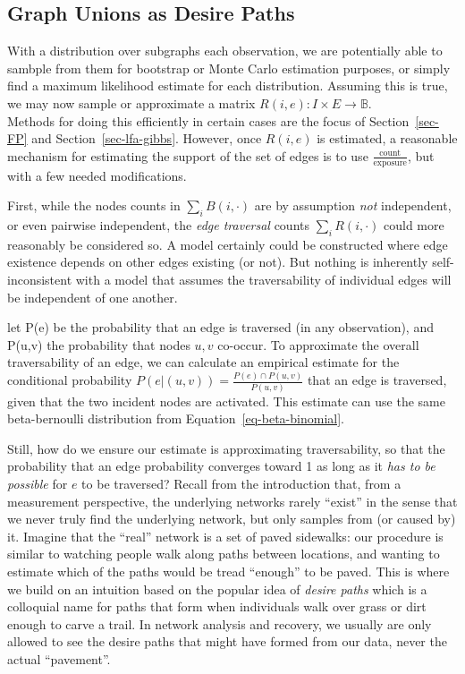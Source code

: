 \documentclass[%
	12pt,
		oneside,
		letterpaper
]{book}
\begin{document}
\subsection{Graph Unions as Desire
Paths}\label{graph-unions-as-desire-paths}

With a distribution over subgraphs each observation, we are potentially
able to sambple from them for bootstrap or Monte Carlo estimation
purposes, or simply find a maximum likelihood estimate for each
distribution. Assuming this is true, we may now sample or approximate a
matrix \(R(i,e):I\times E \rightarrow \mathbb{B}\).\\
Methods for doing this efficiently in certain cases are the focus of
Section~\ref{sec-FP} and Section~\ref{sec-lfa-gibbs}. However, once
\(R(i,e)\) is estimated, a reasonable mechanism for estimating the
support of the set of edges is to use
\(\frac{\text{count}}{\text{exposure}}\), but with a few needed
modifications.

First, while the nodes counts in \(\sum_i B(i,\cdot)\) are by assumption
\emph{not} independent, or even pairwise independent, the \emph{edge
traversal} counts \(\sum_i R(i,\cdot)\) could more reasonably be
considered so. A model certainly could be constructed where edge
existence depends on other edges existing (or not). But nothing is
inherently self-inconsistent with a model that assumes the
traversability of individual edges will be independent of one another.

let P(e) be the probability that an edge is traversed (in any
observation), and P(u,v) the probability that nodes \(u,v\) co-occur. To
approximate the overall traversability of an edge, we can calculate an
empirical estimate for the conditional probability
\(P(e|(u,v))=\frac{P(e)\cap P(u,v)}{P(u,v)}\) that an edge is traversed,
given that the two incident nodes are activated. This estimate can use
the same beta-bernoulli distribution from
Equation~\ref{eq-beta-binomial}.

Still, how do we ensure our estimate is approximating traversability, so
that the probability that an edge probability converges toward 1 as long
as it \emph{has to be possible} for \(e\) to be traversed? Recall from
the introduction that, from a measurement perspective, the underlying
networks rarely ``exist'' in the sense that we never truly find the
underlying network, but only samples from (or caused by) it. Imagine
that the ``real'' network is a set of paved sidewalks: our procedure is
similar to watching people walk along paths between locations, and
wanting to estimate which of the paths would be tread ``enough'' to be
paved. This is where we build on an intuition based on the popular idea
of \emph{desire paths} which is a colloquial name for paths that form
when individuals walk over grass or dirt enough to carve a trail. In
network analysis and recovery, we usually are only allowed to see the
desire paths that might have formed from our data, never the actual
``pavement''.
\end{document}
